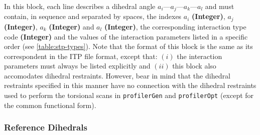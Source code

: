 \documentclass[10pt,a4paper,openany]{memoir}
\numberwithin{equation}{section}
\newcommand{\profileropt}[0]{\texttt{profilerOpt}}
\newcommand{\profilergen}[0]{\texttt{profilerGen}}
\begin{document}
In this block, each line describes a dihedral angle
$a_i$---$a_j$---$a_k$---$a_l$ and must contain, in sequence and
separated by spaces, the indexes $a_i$ \textbf{(Integer)}, $a_j$
\textbf{(Integer)}, $a_k$ \textbf{(Integer)} and $a_l$
\textbf{(Integer)}, the corresponding interaction type code
\textbf{(Integer)} and the values of the interaction parameters listed
in a specific order (see \autoref{table:stp-types}). Note that the
format of this block is the same as its correspondent in the ITP file
format, except that: $(i)$ the interaction parameters must always be
listed explicitly and $(ii)$ this block also accomodates dihedral
restraints.
However, bear in mind that the dihedral restraints specified in this
manner have no connection with the dihedral restraints used to perform
the torsional scans in \profilergen{} and \profileropt{} (except for
the common functional form).


\subsubsection{Reference Dihedrals}
\label{sec:stp-ref_dihedral}
\end{document}

